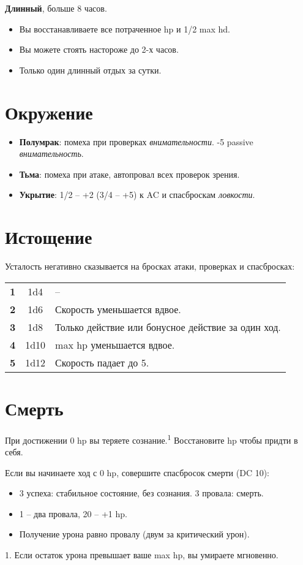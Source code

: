 \documentclass[a4paper,landscape,12pt]{book}
\begin{document}
\begin{multicols}{3}
\textbf{Длинный}, больше 8 часов.
\begin{itemize}
    \item Вы восстанавливаете все потраченное hp и 1/2 max hd.
    \item Вы можете стоять настороже до 2-х часов.
    \item Только один длинный отдых за сутки.
\end{itemize}

\section{Окружение}
\begin{itemize}
    \item \textbf{Полумрак}: помеха при проверках \textit{внимательности}. -5 passive \textit{внимательность}.
    \item \textbf{Тьма}: помеха при атаке, автопровал всех проверок зрения.
    \item \textbf{Укрытие}: 1/2 -- +2 (3/4 -- +5) к AC и спасброскам \textit{ловкости}.
\end{itemize}

\section{Истощение}
Усталость негативно сказывается на бросках атаки, проверках и спасбросках:
\vspace{\baselineskip}

\begin{tabular}{ c c p{5.8cm} }
    \textbf{1} & 1d4 & -- \\[2pt]
    \textbf{2} & 1d6 & Скорость уменьшается вдвое. \\[2pt]
    \textbf{3} & 1d8 & Только действие или бонусное действие за один ход. \\[2pt]
    \textbf{4} & 1d10 & max hp уменьшается вдвое. \\[2pt]
    \textbf{5} & 1d12 & Скорость падает до 5. \\[2pt]
\end{tabular}

\section{Смерть}
При достижении 0 hp вы теряете сознание.\textsuperscript{1} Восстановите hp чтобы придти в себя.

Если вы начинаете ход с 0 hp, совершите спасбросок смерти (DC 10):

\begin{itemize}
    \item 3 успеха: стабильное состояние, без сознания. 3 провала: смерть.
    \item 1 -- два провала, 20 -- +1 hp.
    \item Получение урона равно провалу (двум за критический урон).
\end{itemize}

\setlength{\parindent}{0pt}
1. Если остаток урона превышает ваше max hp, вы умираете мгновенно.

\end{multicols}
\end{document}
